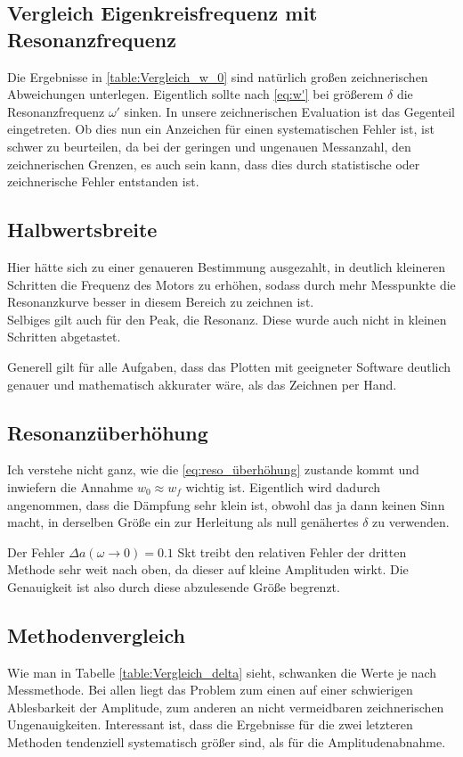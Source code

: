 \subsection{Vergleich Eigenkreisfrequenz mit Resonanzfrequenz}
Die Ergebnisse in \cref{table:Vergleich_w_0} sind natürlich großen zeichnerischen Abweichungen unterlegen. Eigentlich sollte nach \cref{eq:w'} bei größerem \(\delta\) die Resonanzfrequenz \(\omega'\) sinken. In unsere zeichnerischen Evaluation ist das Gegenteil eingetreten. Ob dies nun ein Anzeichen für einen systematischen Fehler ist, ist schwer zu beurteilen, da bei der geringen und ungenauen Messanzahl, den zeichnerischen Grenzen, es auch sein kann, dass dies durch statistische oder zeichnerische Fehler entstanden ist. 

\subsection{Halbwertsbreite}
Hier hätte sich zu einer genaueren Bestimmung ausgezahlt, in deutlich kleineren Schritten die Frequenz des Motors zu erhöhen, sodass durch mehr Messpunkte die Resonanzkurve besser in diesem Bereich zu zeichnen ist. \\
Selbiges gilt auch für den Peak, die Resonanz. Diese wurde auch nicht in kleinen Schritten abgetastet. 

Generell gilt für alle Aufgaben, dass das Plotten mit geeigneter Software deutlich genauer und mathematisch akkurater wäre, als das Zeichnen per Hand. 

\subsection{Resonanzüberhöhung}
Ich verstehe nicht ganz, wie die \cref{eq:reso_überhöhung}
zustande kommt und inwiefern die Annahme \(w_0\approx w_f\) wichtig ist. Eigentlich wird dadurch angenommen, dass die Dämpfung sehr klein ist, obwohl das ja dann keinen Sinn macht, in derselben Größe ein zur Herleitung als null genähertes \(\delta\) zu verwenden. 

Der Fehler \(\Delta a(\omega\to0)=0.1\) Skt treibt den relativen Fehler der dritten Methode sehr weit nach oben, da dieser auf kleine Amplituden wirkt. Die Genauigkeit ist also durch diese abzulesende Größe begrenzt.

\subsection{Methodenvergleich}
Wie man in Tabelle \cref{table:Vergleich_delta} sieht, schwanken die Werte je nach Messmethode. Bei allen liegt das Problem zum einen auf einer schwierigen Ablesbarkeit der Amplitude, zum anderen an nicht vermeidbaren zeichnerischen Ungenauigkeiten. Interessant ist, dass die Ergebnisse für die zwei letzteren Methoden tendenziell systematisch größer sind, als für die Amplitudenabnahme. 

